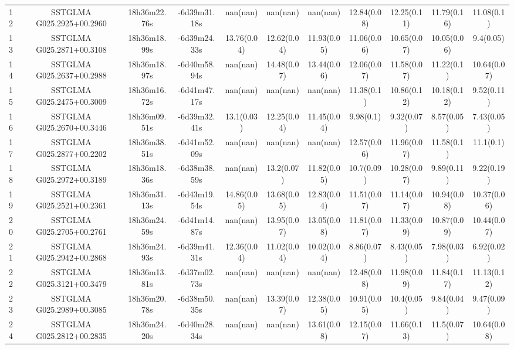 \begin{table}
{{\begin{tabular}[c]{lcccccccccc}
12 & SSTGLMA G025.2925+00.2960 & 18h36m22.76s & -6d39m31.18s & nan(nan)    & nan(nan)    & nan(nan)    & 12.84(0.08) & 12.25(0.11) & 11.79(0.16) & 11.08(0.1) \\
13 & SSTGLMA G025.2871+00.3108 & 18h36m18.99s & -6d39m24.33s & 13.76(0.04) & 12.62(0.04) & 11.93(0.05) & 11.06(0.06) & 10.65(0.07) & 10.05(0.06) & 9.4(0.05) \\
14 & SSTGLMA G025.2637+00.2988 & 18h36m18.97s & -6d40m58.94s & nan(nan)    & 14.48(0.07) & 13.44(0.06) & 12.06(0.07) & 11.58(0.07) & 11.22(0.1)  & 10.64(0.07) \\
15 & SSTGLMA G025.2475+00.3009 & 18h36m16.72s & -6d41m47.17s & nan(nan)    & nan(nan)    & nan(nan)    & 11.38(0.1)  & 10.86(0.12) & 10.18(0.12) & 9.52(0.11) \\
16 & SSTGLMA G025.2670+00.3446 & 18h36m09.51s & -6d39m32.41s & 13.1(0.03)  & 12.25(0.04) & 11.45(0.04) & 9.98(0.1)   & 9.32(0.07)  & 8.57(0.05)  & 7.43(0.05) \\
17 & SSTGLMA G025.2877+00.2202 & 18h36m38.51s & -6d41m52.09s & nan(nan)    & nan(nan)    & nan(nan)    & 12.57(0.06) & 11.96(0.07) & 11.58(0.1)  & 11.1(0.1) \\
18 & SSTGLMA G025.2972+00.3189 & 18h36m18.36s & -6d38m38.59s & nan(nan)    & 13.2(0.07)  & 11.82(0.05) & 10.7(0.09)  & 10.28(0.07) & 9.89(0.11)  & 9.22(0.19) \\
19 & SSTGLMA G025.2521+00.2361 & 18h36m31.13s & -6d43m19.54s & 14.86(0.05) & 13.68(0.05) & 12.83(0.04) & 11.51(0.07) & 11.14(0.07) & 10.94(0.08) & 10.37(0.06) \\
20 & SSTGLMA G025.2705+00.2761 & 18h36m24.59s & -6d41m14.87s & nan(nan)    & 13.95(0.07) & 13.05(0.08) & 11.81(0.07) & 11.33(0.09) & 10.87(0.09) & 10.44(0.07) \\
21 & SSTGLMA G025.2942+00.2868 & 18h36m24.93s & -6d39m41.31s & 12.36(0.04) & 11.02(0.04) & 10.02(0.04) & 8.86(0.07)  & 8.43(0.05)  & 7.98(0.03)  & 6.92(0.02) \\
22 & SSTGLMA G025.3121+00.3479 & 18h36m13.81s & -6d37m02.73s & nan(nan)    & nan(nan)    & nan(nan)    & 12.48(0.08) & 11.98(0.09) & 11.84(0.17) & 11.13(0.12) \\
23 & SSTGLMA G025.2989+00.3085 & 18h36m20.78s & -6d38m50.35s & nan(nan)    & 13.39(0.07) & 12.38(0.05) & 10.91(0.05) & 10.4(0.05)  & 9.84(0.04)  & 9.47(0.09) \\
24 & SSTGLMA G025.2812+00.2835 & 18h36m24.20s & -6d40m28.34s & nan(nan)    & nan(nan)    & 13.61(0.08) & 12.15(0.07) & 11.66(0.13) & 11.5(0.07)  & 10.64(0.08) \\

\end{tabular}}}
\end{table}
